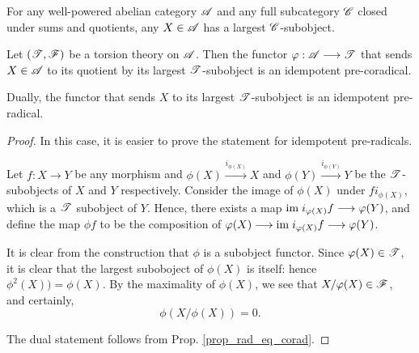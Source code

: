 \begin{por}
For any well-powered abelian category $\mathscr{A}$ and any full 
subcategory $\mathscr{C}$ closed under sums and quotients, any $X \in 
\mathscr{A}$ has a largest $\mathscr{C}$-subobject.
\end{por}

\begin{prop}\label{prop_tt_to_corad}
Let $(\mathscr{T}, \mathscr{F})$ be a torsion theory on $\mathscr{A}$. Then
the functor $\varphi: \mathscr{A} \longrightarrow \mathscr{T}$ that sends $X \in \mathscr{A}$
to its quotient by its largest $\mathscr{T}$-subobject is an 
idempotent pre-coradical.

Dually, the functor that sends $X$ to its largest 
$\mathscr{T}$-subobject is an idempotent pre-radical.
\end{prop}
\begin{proof}
In this case, it is easier to prove the statement for idempotent 
pre-radicals.

Let $f: X \to Y$ be any morphism and $\phi(X) 
\stackrel{i_{\phi(X)}}{\to} X$ and 
$\phi(Y)\stackrel{i_{\phi(Y)}}{\to} Y$ be the $\mathscr{T}$-subobjects 
of $X$ and $Y$ respectively. Consider the image of $\phi(X)$ under 
$f i_{\phi(X)}$, which is a $\mathscr{T}$ subobject of $Y$. Hence, 
there exists a map $\mathrm{im}\; i_{\varphi(X)}f \longrightarrow \varphi(Y)$, and define the 
map $\phi f$ to be the composition of $\varphi(X) \longrightarrow \mathrm{im}\; 
i_{\varphi(X)}f \longrightarrow \varphi(Y)$.

It is clear from the construction that $\phi$ is a subobject functor.
Since $\varphi(X) \in \mathscr{T}$, it is clear that the largest suboboject
of $\phi(X)$ is itself: hence $\phi^2(X)) = \phi(X)$. By the 
maximality of $\phi(X)$, we see that $X/\varphi(X) \in \mathscr{F}$, and
certainly, 
\[
\phi(X/\phi(X)) = 0.
\]

The dual statement follows from Prop. \ref{prop_rad_eq_corad}.
\end{proof}

